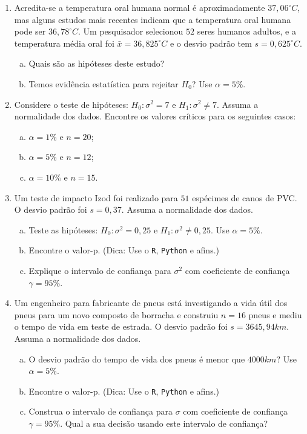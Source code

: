 \documentclass[12pt, a4paper]{article}
\begin{document}
\begin{enumerate}
	\item Acredita-se a temperatura oral humana normal é aproximadamente $37,06^\circ C$, mas alguns estudos mais recentes indicam que a temperatura oral humana pode ser $36,78^\circ C$. Um pesquisador selecionou $52$ seres humanos adultos, e a temperatura média oral foi $\bar{x} = 36,825^\circ C$ e o desvio padrão tem $s = 0,625^\circ C$.
	\begin{enumerate}[(a)]
		\item Quais são as hipóteses deste estudo?
		\item Temos evidência estatística para rejeitar $H_0$? Use $\alpha=5\%$.
	\end{enumerate}

	\item Considere o teste de hipóteses: $H_0: \sigma^2 = 7$ e $H_1: \sigma^2 \neq 7$. Assuma a normalidade dos dados. Encontre os valores críticos para os seguintes casos:
	\begin{enumerate}[(a)]
		\item $\alpha=1\%$ e $n=20$;
		\item $\alpha=5\%$ e $n=12$;
		\item $\alpha=10\%$ e $n=15$.
	\end{enumerate}

	\item Um teste de impacto Izod foi realizado para $51$ espécimes de canos de PVC. O desvio padrão foi $s=0,37$. Assuma a normalidade dos dados.
	\begin{enumerate}[(a)]
		\item Teste as hipóteses: $H_0: \sigma^2 = 0,25$ e $H_1: \sigma^2 \neq 0,25$. Use $\alpha=5\%$.
		\item Encontre o valor-p. (Dica: Use o \texttt{R}, \texttt{Python} e afins.)
		\item Explique o intervalo de confiança para $\sigma^2$ com coeficiente de confiança $\gamma=95\%$.
	\end{enumerate}

	\item Um engenheiro para fabricante de pneus está investigando a vida útil dos pneus para um novo composto de borracha e construiu $n=16$ pneus e mediu o tempo de vida em teste de estrada. O desvio padrão foi $s = 3645,94km$. Assuma a normalidade dos dados.
	\begin{enumerate}[(a)]
		\item O desvio padrão do tempo de vida dos pneus é menor que $4000km$? Use $\alpha=5\%$.
		\item Encontre o valor-p. (Dica: Use o \texttt{R}, \texttt{Python} e afins.)
		\item Construa o intervalo de confiança para $\sigma$ com coeficiente de confiança $\gamma=95\%$. Qual a sua decisão usando este intervalo de confiança?
	\end{enumerate}


\end{enumerate}
\end{document}
